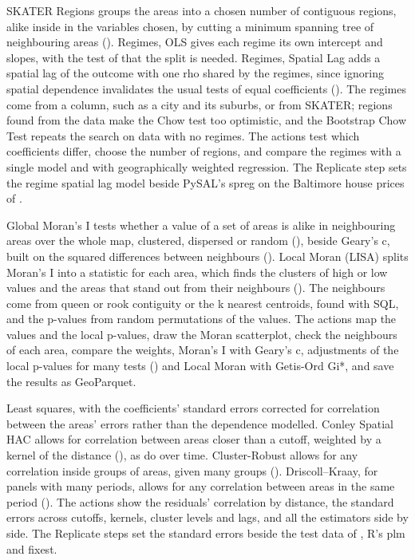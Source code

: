 SKATER Regions groups the areas into a chosen number of contiguous regions, alike inside in the variables chosen, by cutting a minimum spanning tree of neighbouring areas (). Regimes, OLS gives each regime its own intercept and slopes, with the test of  that the split is needed. Regimes, Spatial Lag adds a spatial lag of the outcome with one rho shared by the regimes, since ignoring spatial dependence invalidates the usual tests of equal coefficients (). The regimes come from a column, such as a city and its suburbs, or from SKATER; regions found from the data make the Chow test too optimistic, and the Bootstrap Chow Test repeats the search on data with no regimes. The actions test which coefficients differ, choose the number of regions, and compare the regimes with a single model and with geographically weighted regression. The Replicate step sets the regime spatial lag model beside PySAL's spreg on the Baltimore house prices of .

Global Moran's I tests whether a value of a set of areas is alike in neighbouring areas over the whole map, clustered, dispersed or random (), beside Geary's c, built on the squared differences between neighbours (). Local Moran (LISA) splits Moran's I into a statistic for each area, which finds the clusters of high or low values and the areas that stand out from their neighbours (). The neighbours come from queen or rook contiguity or the k nearest centroids, found with SQL, and the p-values from random permutations of the values. The actions map the values and the local p-values, draw the Moran scatterplot, check the neighbours of each area, compare the weights, Moran's I with Geary's c, adjustments of the local p-values for many tests () and Local Moran with Getis-Ord Gi*, and save the results as GeoParquet.

Least squares, with the coefficients' standard errors corrected for correlation between the areas' errors rather than the dependence modelled. Conley Spatial HAC allows for correlation between areas closer than a cutoff, weighted by a kernel of the distance (), as  do over time. Cluster-Robust allows for any correlation inside groups of areas, given many groups (). Driscoll--Kraay, for panels with many periods, allows for any correlation between areas in the same period (). The actions show the residuals' correlation by distance, the standard errors across cutoffs, kernels, cluster levels and lags, and all the estimators side by side. The Replicate steps set the standard errors beside the test data of , R's plm and fixest.

